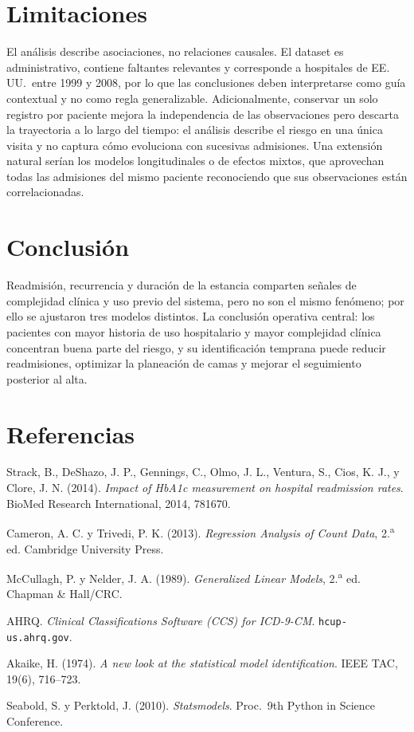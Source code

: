 \documentclass[11pt]{article}
\begin{document}
\section{Limitaciones}

El análisis describe asociaciones, no relaciones causales. El dataset es administrativo, contiene faltantes relevantes y corresponde a hospitales de EE.\,UU.\ entre 1999 y 2008, por lo que las conclusiones deben interpretarse como guía contextual y no como regla generalizable. Adicionalmente, conservar un solo registro por paciente mejora la independencia de las observaciones pero descarta la trayectoria a lo largo del tiempo: el análisis describe el riesgo en una única visita y no captura cómo evoluciona con sucesivas admisiones. Una extensión natural serían los modelos longitudinales o de efectos mixtos, que aprovechan todas las admisiones del mismo paciente reconociendo que sus observaciones están correlacionadas.

\section{Conclusión}

Readmisión, recurrencia y duración de la estancia comparten señales de complejidad clínica y uso previo del sistema, pero no son el mismo fenómeno; por ello se ajustaron tres modelos distintos. La conclusión operativa central: los pacientes con mayor historia de uso hospitalario y mayor complejidad clínica concentran buena parte del riesgo, y su identificación temprana puede reducir readmisiones, optimizar la planeación de camas y mejorar el seguimiento posterior al alta.

\section*{Referencias}

{\small
\begin{enumerate}[label={[\arabic*]}, leftmargin=1.6em, itemsep=0.1em, topsep=0.2em]
    \item Strack, B., DeShazo, J. P., Gennings, C., Olmo, J. L., Ventura, S., Cios, K. J., y Clore, J. N. (2014). \textit{Impact of HbA1c measurement on hospital readmission rates}. BioMed Research International, 2014, 781670.
    \item Cameron, A. C. y Trivedi, P. K. (2013). \textit{Regression Analysis of Count Data}, 2.\textsuperscript{a} ed. Cambridge University Press.
    \item McCullagh, P. y Nelder, J. A. (1989). \textit{Generalized Linear Models}, 2.\textsuperscript{a} ed. Chapman \& Hall/CRC.
    \item AHRQ. \textit{Clinical Classifications Software (CCS) for ICD-9-CM}. \texttt{hcup-us.ahrq.gov}.
    \item Akaike, H. (1974). \textit{A new look at the statistical model identification}. IEEE TAC, 19(6), 716--723.
    \item Seabold, S. y Perktold, J. (2010). \textit{Statsmodels}. Proc.\ 9th Python in Science Conference.
\end{enumerate}
}
\end{document}
